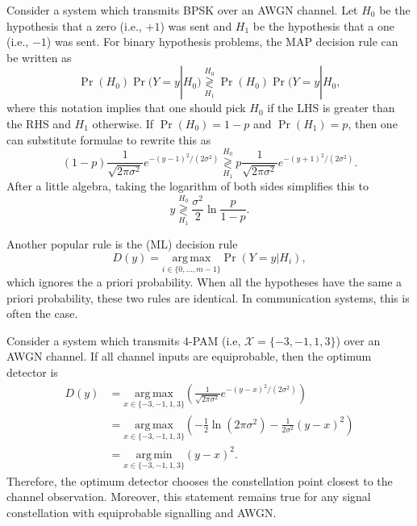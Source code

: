 \begin{example}
Consider a system which transmits BPSK over an AWGN channel.
Let $H_0$ be the hypothesis that a zero (i.e., $+1$) was sent and $H_1$ be the hypothesis that a one (i.e., $-1$) was sent.
For binary hypothesis problems, the MAP decision rule can be written as
\[ \Pr (H_0) \Pr (Y=y | H_0) \underset{H_1}{\overset{H_0}{\gtrless}}  \Pr (H_0) \Pr (Y=y | H_0, \]
where this notation implies that one should pick $H_0$ if the LHS is greater than the RHS and $H_1$ otherwise.
If $\Pr(H_0) = 1-p$ and $\Pr (H_1) = p$, then one can substitute formulae to rewrite this as
\[ (1-p)  \frac{1}{\sqrt{2\pi \sigma^2}} e^{-(y-1)^2 / (2\sigma^2)} \underset{H_1}{\overset{H_0}{\gtrless}}  p \frac{1}{\sqrt{2\pi \sigma^2}} e^{-(y+1)^2 / (2\sigma^2)}.\]
After a little algebra, taking the logarithm of both sides simplifies this to 
\[ y \underset{H_1}{\overset{H_0}{\gtrless}} \frac{\sigma^2}{2}  \ln \frac{p}{1-p}.\]
\end{example}

Another popular rule is the  (ML) decision rule
\[ D(y) = \underset{i\in\{0,\ldots,m-1\}}{\mathrm{arg\,max}} \Pr (Y=y | H_i), \]
which ignores the a priori probability.
When all the hypotheses have the same a priori probability, these two rules are identical.
In communication systems, this is often the case.

\begin{example}
Consider a system which transmits 4-PAM (i.e, $\mathcal{X}=\{-3,-1,1,3\}$) over an AWGN channel.
If all channel inputs are equiprobable, then the optimum detector is
\begin{align*}
D(y)
& =  \underset{x\in\{-3,-1,1,3\}}{\mathrm{arg\,max}} \left( \frac{1}{\sqrt{2\pi \sigma^2}} e^{-(y-x)^2 / (2\sigma^2)} \right) \\
& =  \underset{x\in\{-3,-1,1,3\}}{\mathrm{arg\,max}} \left(-\frac{1}{2}\ln(2\pi \sigma^2) - \frac{1}{2\sigma^2} (y-x)^2 \right) \\
& =  \underset{x\in\{-3,-1,1,3\}}{\mathrm{arg\,min}} (y-x)^2. 
\end{align*}
Therefore, the optimum detector chooses the constellation point closest to the channel observation.
Moreover, this statement remains true for any signal constellation with equiprobable signalling and AWGN.
\end{example}

